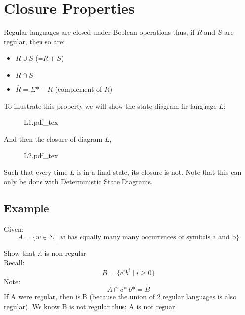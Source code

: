 \documentclass[12pt]{book}
\title{\coursetitle\linebreak\lecturename}
\author{\\Cain Susko\\ 
           \\ \\ \\
      Queen's University 
    \\School of Computing\\}
\newcommand{\incfig}[1]{%
    {#1.pdf_tex}
}
\begin{document}
\begin{titlepage}
        \maketitle
\end{titlepage}


\section*{Closure Properties}
Regular languages are closed under Boolean operations thus, if $R$ and $S$ are regular, then so are:
 \begin{itemize}
        \item $R\cup S$ (=$R+S$)
        \item  $R\cap S$
        \item  $\overline{R} = \Sigma\text{*} -R$ (complement of $R$)
\end{itemize}

To illustrate this property we will show the state diagram fir language $L$:
 \begin{figure}[h]
        \centering
        \incfig{L1}
\end{figure}

And then the closure of diagram $L$,
\begin{figure}[h]
        \centering
        \incfig{L2}
\end{figure}

Such that every time $L$ is in a final state, its closure is not.
Note that this can only be done with Deterministic State Diagrams.
\pagebreak

\subsection*{Example}
Given:
\[A = \{w\in\Sigma  \mid  w\text{ has equally many many occurrences of symbols a and b} \}\]

Show that $A$ is non-regular\\
Recall:
\[B = \{a^i b^i \mid i \geq 0\}\]
Note:
\[A\cap a\text{*}\;b\text{*} = B\]
If A were regular, then is B (because the union of 2 regular languages is also regular). We know B is not regular thus: A is not reguar
\end{document}
